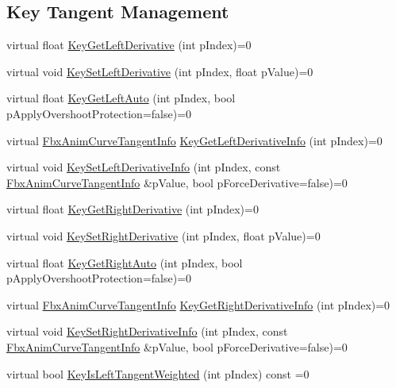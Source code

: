 \subsection*{Key Tangent Management}
\begin{DoxyCompactItemize}
\item 
virtual float \hyperlink{class_fbx_anim_curve_a9ccab8818487ccaaaf908c5367e3f9e9}{Key\+Get\+Left\+Derivative} (int p\+Index)=0
\item 
virtual void \hyperlink{class_fbx_anim_curve_afbec5f6b274395cb1a3d8d1eb379982f}{Key\+Set\+Left\+Derivative} (int p\+Index, float p\+Value)=0
\item 
virtual float \hyperlink{class_fbx_anim_curve_a1bd66bdbb3e7e798d70695dc97f71dc7}{Key\+Get\+Left\+Auto} (int p\+Index, bool p\+Apply\+Overshoot\+Protection=false)=0
\item 
virtual \hyperlink{struct_fbx_anim_curve_tangent_info}{Fbx\+Anim\+Curve\+Tangent\+Info} \hyperlink{class_fbx_anim_curve_a28398566658955d12824942635ee45ab}{Key\+Get\+Left\+Derivative\+Info} (int p\+Index)=0
\item 
virtual void \hyperlink{class_fbx_anim_curve_a8fa694edd4fb27b9b61739efa9e27083}{Key\+Set\+Left\+Derivative\+Info} (int p\+Index, const \hyperlink{struct_fbx_anim_curve_tangent_info}{Fbx\+Anim\+Curve\+Tangent\+Info} \&p\+Value, bool p\+Force\+Derivative=false)=0
\item 
virtual float \hyperlink{class_fbx_anim_curve_a8fb62fd9043cccbc129fad343d1610ba}{Key\+Get\+Right\+Derivative} (int p\+Index)=0
\item 
virtual void \hyperlink{class_fbx_anim_curve_a1de09a5f76f6eb12d0170cbd36fe6a78}{Key\+Set\+Right\+Derivative} (int p\+Index, float p\+Value)=0
\item 
virtual float \hyperlink{class_fbx_anim_curve_a55a43ce2a48ceccd753cdb10a7acf77e}{Key\+Get\+Right\+Auto} (int p\+Index, bool p\+Apply\+Overshoot\+Protection=false)=0
\item 
virtual \hyperlink{struct_fbx_anim_curve_tangent_info}{Fbx\+Anim\+Curve\+Tangent\+Info} \hyperlink{class_fbx_anim_curve_a3c586d4f3cdcfbccc9fadf99bce03fd5}{Key\+Get\+Right\+Derivative\+Info} (int p\+Index)=0
\item 
virtual void \hyperlink{class_fbx_anim_curve_a609a6e5f3ee69b04e46e75597cc5e1cf}{Key\+Set\+Right\+Derivative\+Info} (int p\+Index, const \hyperlink{struct_fbx_anim_curve_tangent_info}{Fbx\+Anim\+Curve\+Tangent\+Info} \&p\+Value, bool p\+Force\+Derivative=false)=0
\item 
virtual bool \hyperlink{class_fbx_anim_curve_af73a0bbb95ba2c7516438b68de733f1a}{Key\+Is\+Left\+Tangent\+Weighted} (int p\+Index) const =0

\end{DoxyCompactItemize}
